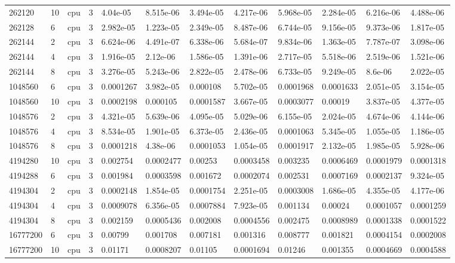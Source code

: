 \begin{tabular}{llllllllllll}
262120 & 10 & cpu & 3 & 4.04e-05 & 8.515e-06 & 3.494e-05 & 4.217e-06 & 5.968e-05 & 2.284e-05 & 6.216e-06 & 4.488e-06 \\
262128 & 6 & cpu & 3 & 2.982e-05 & 1.223e-05 & 2.349e-05 & 8.487e-06 & 6.744e-05 & 9.156e-05 & 9.373e-06 & 1.817e-05 \\
262144 & 2 & cpu & 3 & 6.624e-06 & 4.491e-07 & 6.338e-06 & 5.684e-07 & 9.834e-06 & 1.363e-05 & 7.787e-07 & 3.098e-06 \\
262144 & 4 & cpu & 3 & 1.916e-05 & 2.12e-06 & 1.586e-05 & 1.391e-06 & 2.717e-05 & 5.518e-06 & 2.519e-06 & 1.521e-06 \\
262144 & 8 & cpu & 3 & 3.276e-05 & 5.243e-06 & 2.822e-05 & 2.478e-06 & 6.733e-05 & 9.249e-05 & 8.6e-06 & 2.022e-05 \\
1048560 & 6 & cpu & 3 & 0.0001267 & 3.982e-05 & 0.000108 & 5.702e-05 & 0.0001968 & 0.0001633 & 2.051e-05 & 3.154e-05 \\
1048560 & 10 & cpu & 3 & 0.0002198 & 0.000105 & 0.0001587 & 3.667e-05 & 0.0003077 & 0.00019 & 3.837e-05 & 4.377e-05 \\
1048576 & 2 & cpu & 3 & 4.321e-05 & 5.639e-06 & 4.095e-05 & 5.029e-06 & 6.155e-05 & 2.024e-05 & 4.674e-06 & 4.144e-06 \\
1048576 & 4 & cpu & 3 & 8.534e-05 & 1.901e-05 & 6.373e-05 & 2.436e-05 & 0.0001063 & 5.345e-05 & 1.055e-05 & 1.186e-05 \\
1048576 & 8 & cpu & 3 & 0.0001218 & 4.38e-06 & 0.0001053 & 1.054e-05 & 0.0001917 & 2.132e-05 & 1.985e-05 & 5.928e-06 \\
4194280 & 10 & cpu & 3 & 0.002754 & 0.0002477 & 0.00253 & 0.0003458 & 0.003235 & 0.0006469 & 0.0001979 & 0.0001318 \\
4194288 & 6 & cpu & 3 & 0.001984 & 0.0003598 & 0.001672 & 0.0002074 & 0.002531 & 0.0007169 & 0.0002137 & 9.324e-05 \\
4194304 & 2 & cpu & 3 & 0.0002148 & 1.854e-05 & 0.0001754 & 2.251e-05 & 0.0003008 & 1.686e-05 & 4.355e-05 & 4.177e-06 \\
4194304 & 4 & cpu & 3 & 0.0009078 & 6.356e-05 & 0.0007884 & 7.923e-05 & 0.001134 & 0.00024 & 0.0001057 & 0.0001259 \\
4194304 & 8 & cpu & 3 & 0.002159 & 0.0005436 & 0.002008 & 0.0004556 & 0.002475 & 0.0008989 & 0.0001338 & 0.0001522 \\
16777200 & 6 & cpu & 3 & 0.00799 & 0.001708 & 0.007181 & 0.001316 & 0.008777 & 0.001821 & 0.0004154 & 0.0002008 \\
16777200 & 10 & cpu & 3 & 0.01171 & 0.0008207 & 0.01105 & 0.0001694 & 0.01246 & 0.001355 & 0.0004669 & 0.0004588 \\

\end{tabular}
